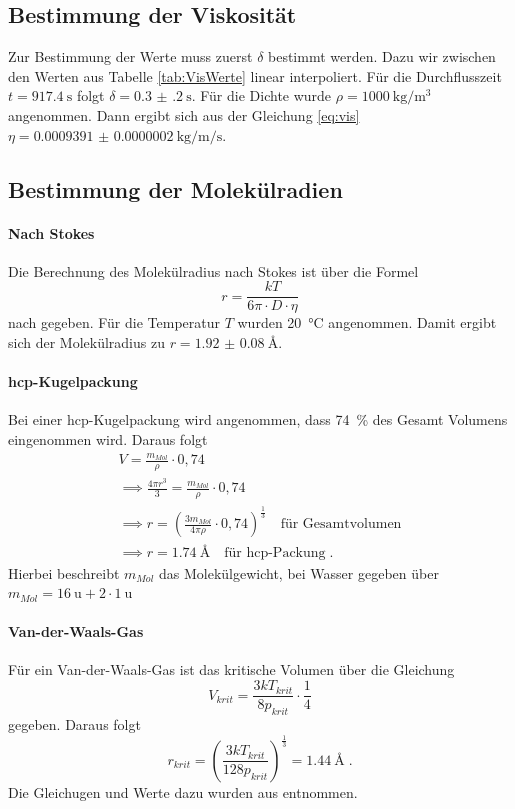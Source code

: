 \subsection{Bestimmung der Viskosität}
Zur Bestimmung der Werte muss zuerst $\delta$ bestimmt werden. Dazu wir zwischen den Werten aus Tabelle \ref{tab:VisWerte} 
linear interpoliert. Für die Durchflusszeit $t = \SI{917 .4}{\second}$ folgt $\delta = \SI{0.3(2)}{\second}$. Für die 
Dichte wurde $\rho = \SI{1000}{\kilo\gram\per \cubic\meter}$ angenommen. Dann ergibt sich 
aus der Gleichung \eqref{eq:vis} $\eta = \SI{0.0009391(2)}{\kilo\gram\per\meter\per\second}$.
\subsection{Bestimmung der Molekülradien}
\paragraph{Nach Stokes}
Die Berechnung des Molekülradius nach Stokes ist über die Formel 
\begin{equation}
r = \frac{kT}{6\pi \cdot D \cdot \eta} 	
\end{equation}
nach \cite{Anleitung} gegeben. Für die Temperatur $T$ wurden \SI{20}{\celsius} angenommen. Damit ergibt sich der 
Molekülradius zu $r = \SI{1.92(8)}{\angstrom}$. 
\paragraph{hcp-Kugelpackung}
Bei einer hcp-Kugelpackung wird angenommen, dass \SI{74}{\percent} des Gesamt Volumens eingenommen wird. Daraus folgt 
\begin{gather}
V = \frac{m_{Mol}}{\rho} \cdot 0,74 \\
\implies \frac{4\pi r^3}{3} =\frac{m_{Mol}}{\rho}\cdot 0,74 \\
\implies r = \left( \frac{3m_{Mol}}{4\pi \rho }\cdot 0,74 \right)^{\frac{1}{3}} 
\quad \text{für Gesamtvolumen} \\
\implies r = \SI{1.74}{\angstrom} \quad \text{für hcp-Packung} \; . 
\end{gather}
Hierbei beschreibt $m_{Mol}$ das Molekülgewicht, bei Wasser gegeben über $m_{Mol} = \SI{16}{\atomicmassunit} + 2\cdot \SI{1}{\atomicmassunit}$
\paragraph{Van-der-Waals-Gas}
Für ein Van-der-Waals-Gas ist das kritische Volumen über die Gleichung 
\begin{equation}
V_{krit}= \frac{3kT_{krit}}{8p_{krit}} \cdot \frac{1}{4}	
\end{equation}
gegeben. Daraus folgt 
\begin{equation}
r_{krit} = \left( \frac{3kT_{krit}}{128p_{krit}} \right)^{\frac{1}{3}} = \SI{1.44}{\angstrom} \;.
\end{equation}
Die Gleichugen und Werte dazu wurden aus \cite{spektrum} entnommen.

